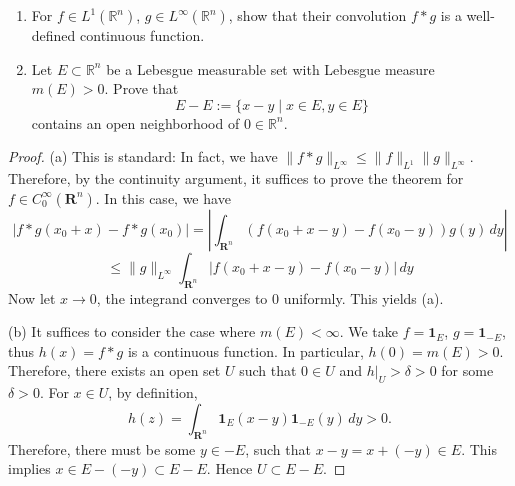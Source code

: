 \begin{exercise}
\begin{enumerate}
		\item For $f \in L^1(\mathbb{R}^n)$, $g \in L^\infty(\mathbb{R}^n)$, show that their convolution $f * g$ is a well-defined continuous function.
		\item Let $E \subset \mathbb{R}^n$ be a Lebesgue measurable set with Lebesgue measure $m(E) > 0$. Prove that
\[
E - E := \{ x - y \mid x \in E, y \in E \}
\]contains an open neighborhood of $0 \in \mathbb{R}^n$.
	\end{enumerate}
\end{exercise}
\begin{proof}
(a) This is standard: In fact, we have $\|f * g\|_{L^\infty} \leq \|f\|_{L^1} \|g\|_{L^\infty}$. Therefore, by the continuity argument, it suffices to prove the theorem for $f \in C_0^\infty(\mathbf{R}^n)$. In this case, we have
\[
|f * g(x_0 + x) - f * g(x_0)| = \left| \int_{\mathbf{R}^n} (f(x_0 + x - y) - f(x_0 - y)) g(y) \, dy \right|
\]
\[
\leq \|g\|_{L^\infty} \int_{\mathbf{R}^n} |f(x_0 + x - y) - f(x_0 - y)| \, dy
\]
Now let $x \to 0$, the integrand converges to 0 uniformly. This yields (a).

(b) It suffices to consider the case where $m(E) < \infty$. We take $f = \mathbf{1}_E$, $g = \mathbf{1}_{-E}$, thus $h(x) = f * g$ is a continuous function. In particular, $h(0) = m(E) > 0$. Therefore, there exists an open set $U$ such that $0 \in U$ and $h|_U > \delta > 0$ for some $\delta > 0$. For $x \in U$, by definition,
\[
h(z) = \int_{\mathbf{R}^n} \mathbf{1}_E(x - y) \mathbf{1}_{-E}(y) \, dy > 0.
\]
Therefore, there must be some $y \in -E$, such that $x - y = x + (-y) \in E$. This implies $x \in E - (-y) \subset E - E$. Hence $U \subset E - E$.
\end{proof}

